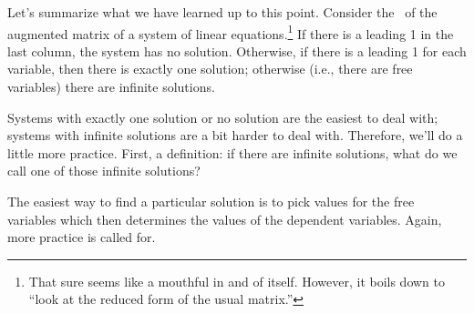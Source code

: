 %
%

Let's summarize what we have learned up to this point. Consider the \rref\ of the augmented matrix of a system of linear equations.\footnote{That sure seems like a mouthful in and of itself. However, it boils down to ``look at the reduced form of the usual matrix.''} If there is a leading 1 in the last column, the system has no solution. Otherwise, if there is a leading 1 for each variable, then there is exactly one solution; otherwise (i.e., there are free variables) there are infinite solutions.

Systems with exactly one solution or no solution are the easiest to deal with; systems with infinite solutions are a bit harder to deal with. Therefore, we'll do a little more practice. First, a definition: if there are infinite solutions, what do we call one of those infinite solutions?


The easiest way to find a particular solution is to pick values for the free variables which then determines the values of the dependent variables. Again, more practice is called for.\\



